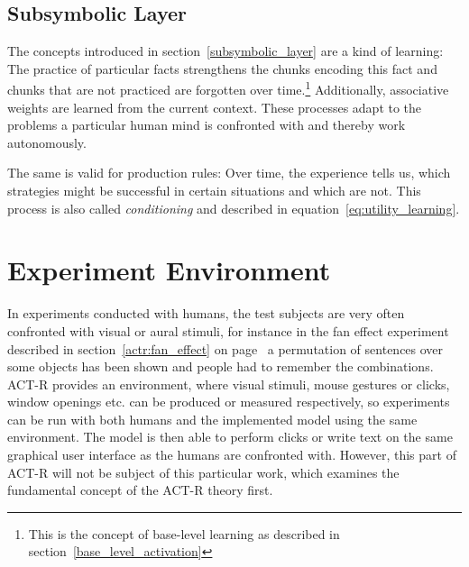 \subsection{Subsymbolic Layer}

The concepts introduced in section~\ref{subsymbolic_layer} are a kind of learning: The practice of particular facts strengthens the chunks encoding this fact and chunks that are not practiced are forgotten over time.\footnote{This is the concept of base-level learning as described in section~\ref{base_level_activation}} Additionally, associative weights are learned from the current context. These processes adapt to the problems a particular human mind is confronted with and thereby work autonomously.

The same is valid for production rules: Over time, the experience tells us, which strategies might be successful in certain situations and which are not. This process is also called \emph{conditioning} and described in equation~\eqref{eq:utility_learning}.

\section{Experiment Environment}
\label{experiment_environment}

In experiments conducted with humans, the test subjects are very often confronted with visual or aural stimuli, for instance in the fan effect experiment described in section~\ref{actr:fan_effect} on page~\pageref{actr:fan_effect} a permutation of sentences over some objects has been shown and people had to remember the combinations. ACT-R provides an environment, where visual stimuli, mouse gestures or clicks, window openings etc. can be produced or measured respectively, so experiments can be run with both humans and the implemented model using the same environment. The model is then able to perform clicks or write text on the same graphical user interface as the humans are confronted with. However, this part of ACT-R will not be subject of this particular work, which examines the fundamental concept of the ACT-R theory first.

